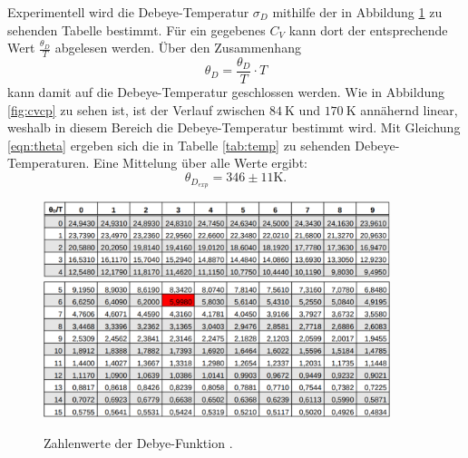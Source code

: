 Experimentell wird die Debeye-Temperatur $\sigma_D$ mithilfe der in Abbildung \ref{fig:deb} zu sehenden Tabelle bestimmt. Für ein gegebenes $C_V$ kann dort der entsprechende Wert $\frac{\theta_D}{T}$ abgelesen werden. Über den Zusammenhang
\begin{equation}
    \theta_D = \frac{\theta_D}{T} \cdot T
    \label{eqn:theta}
\end{equation}
kann damit auf die Debeye-Temperatur geschlossen werden.
Wie in Abbildung \ref{fig:cvcp} zu sehen ist, ist der Verlauf zwischen $\SI{84}{\kelvin}$ und $\SI{170}{\kelvin}$ annähernd linear, weshalb in diesem Bereich die Debeye-Temperatur bestimmt wird.
Mit Gleichung \eqref{eqn:theta}
ergeben sich die in Tabelle \ref{tab:temp} zu sehenden Debeye-Temperaturen. 
Eine Mittelung über alle Werte ergibt:
\begin{equation}
    \theta_{D_{exp}} = 346 \pm 11 \si{\kelvin}.
\end{equation}
\begin{figure}
    \centering
    \includegraphics[width=0.9\textwidth]{content/images/table1.png}
    \includegraphics[width=0.9\textwidth]{content/images/table2.png}
    \caption{Zahlenwerte der Debye-Funktion \cite{anleitung}.}
    \label{fig:deb}
\end{figure}

